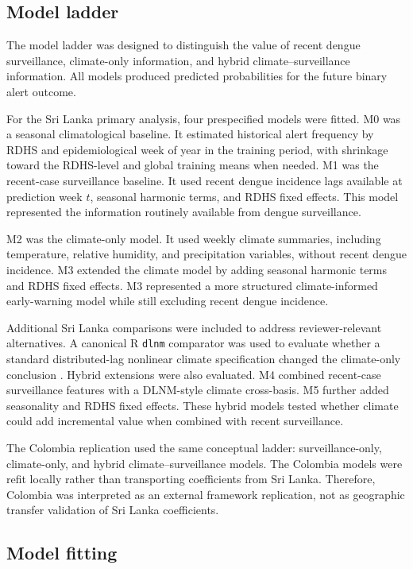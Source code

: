 \documentclass[11pt,a4paper]{article}
\begin{document}
\subsection{Model ladder}
\label{subsec:model-ladder}

The model ladder was designed to distinguish the value of recent dengue surveillance, climate-only information, and hybrid climate--surveillance information. All models produced predicted probabilities for the future binary alert outcome.

For the Sri Lanka primary analysis, four prespecified models were fitted. M0 was a seasonal climatological baseline. It estimated historical alert frequency by RDHS and epidemiological week of year in the training period, with shrinkage toward the RDHS-level and global training means when needed. M1 was the recent-case surveillance baseline. It used recent dengue incidence lags available at prediction week $t$, seasonal harmonic terms, and RDHS fixed effects. This model represented the information routinely available from dengue surveillance.

M2 was the climate-only model. It used weekly climate summaries, including temperature, relative humidity, and precipitation variables, without recent dengue incidence. M3 extended the climate model by adding seasonal harmonic terms and RDHS fixed effects. M3 represented a more structured climate-informed early-warning model while still excluding recent dengue incidence.

Additional Sri Lanka comparisons were included to address reviewer-relevant alternatives. A canonical R \texttt{dlnm} comparator was used to evaluate whether a standard distributed-lag nonlinear climate specification changed the climate-only conclusion \citep{Gasparrini2010,Gasparrini2011}. Hybrid extensions were also evaluated. M4 combined recent-case surveillance features with a DLNM-style climate cross-basis. M5 further added seasonality and RDHS fixed effects. These hybrid models tested whether climate could add incremental value when combined with recent surveillance.

The Colombia replication used the same conceptual ladder: surveillance-only, climate-only, and hybrid climate--surveillance models. The Colombia models were refit locally rather than transporting coefficients from Sri Lanka. Therefore, Colombia was interpreted as an external framework replication, not as geographic transfer validation of Sri Lanka coefficients.

\subsection{Model fitting}
\label{subsec:model-fitting}
\end{document}
